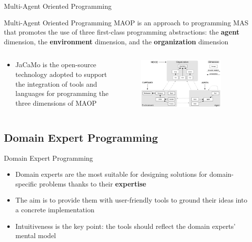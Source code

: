 \begin{frame}{Multi-Agent Oriented Programming}
    \begin{block}{Multi-Agent Oriented Programming}
        MAOP is an approach to programming MAS that promotes the use of three first-class programming abstractions: the \textbf{agent} dimension, the \textbf{environment} dimension, and the \textbf{organization} dimension~\cite{boissier2020multi}
    \end{block}

    \begin{columns}
        \begin{column}{0.4\textwidth}
            \begin{itemize}
                \item JaCaMo is the open-source technology adopted to support the integration of tools and languages for programming the three dimensions of MAOP~\cite{boissier2020multi}
            \end{itemize}
        \end{column}
        \begin{column}{0.6\textwidth}
            \begin{figure}
                \centering
                \includegraphics[width=0.9\textwidth]{images/maop.png}
            \end{figure}
        \end{column}
    \end{columns}
\end{frame}

\subsection{Domain Expert Programming}
\begin{frame}{Domain Expert Programming}
    \begin{itemize}
        \item Domain experts are the most suitable for designing solutions for domain-specific problems thanks to their \textbf{expertise}
        \vspace{0.5cm}
        \item The aim is to provide them with user-friendly tools to ground their ideas into a concrete implementation
        \vspace{0.5cm}
        \item Intuitiveness is the key point: the tools should reflect the domain experts' mental model
    \end{itemize}
\end{frame}

